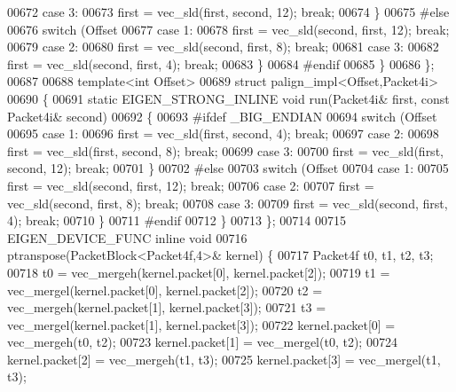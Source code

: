 \begin{DoxyCode}
{00672     \textcolor{keywordflow}{case} 3:
00673       first = vec\_sld(first, second, 12); \textcolor{keywordflow}{break};
00674     \}
00675 \textcolor{preprocessor}{#else}
00676     \textcolor{keywordflow}{switch} (Offset %
00677     \textcolor{keywordflow}{case} 1:
00678       first = vec\_sld(second, first, 12); \textcolor{keywordflow}{break};
00679     \textcolor{keywordflow}{case} 2:
00680       first = vec\_sld(second, first, 8); \textcolor{keywordflow}{break};
00681     \textcolor{keywordflow}{case} 3:
00682       first = vec\_sld(second, first, 4); \textcolor{keywordflow}{break};
00683     \}
00684 \textcolor{preprocessor}{#endif}
00685   \}
00686 \};
00687 
00688 \textcolor{keyword}{template}<\textcolor{keywordtype}{int} Offset>
00689 \textcolor{keyword}{struct }palign\_impl<Offset,Packet4i>
00690 \{
00691   \textcolor{keyword}{static} EIGEN\_STRONG\_INLINE \textcolor{keywordtype}{void} run(Packet4i& first, \textcolor{keyword}{const} Packet4i& second)
00692   \{
00693 \textcolor{preprocessor}{#ifdef \_BIG\_ENDIAN}
00694     \textcolor{keywordflow}{switch} (Offset %
00695     \textcolor{keywordflow}{case} 1:
00696       first = vec\_sld(first, second, 4); \textcolor{keywordflow}{break};
00697     \textcolor{keywordflow}{case} 2:
00698       first = vec\_sld(first, second, 8); \textcolor{keywordflow}{break};
00699     \textcolor{keywordflow}{case} 3:
00700       first = vec\_sld(first, second, 12); \textcolor{keywordflow}{break};
00701     \}
00702 \textcolor{preprocessor}{#else}
00703     \textcolor{keywordflow}{switch} (Offset %
00704     \textcolor{keywordflow}{case} 1:
00705       first = vec\_sld(second, first, 12); \textcolor{keywordflow}{break};
00706     \textcolor{keywordflow}{case} 2:
00707       first = vec\_sld(second, first, 8); \textcolor{keywordflow}{break};
00708     \textcolor{keywordflow}{case} 3:
00709       first = vec\_sld(second, first, 4); \textcolor{keywordflow}{break};
00710     \}
00711 \textcolor{preprocessor}{#endif}
00712   \}
00713 \};
00714 
00715 EIGEN\_DEVICE\_FUNC \textcolor{keyword}{inline} \textcolor{keywordtype}{void}
00716 ptranspose(PacketBlock<Packet4f,4>& kernel) \{
00717   Packet4f t0, t1, t2, t3;
00718   t0 = vec\_mergeh(kernel.packet[0], kernel.packet[2]);
00719   t1 = vec\_mergel(kernel.packet[0], kernel.packet[2]);
00720   t2 = vec\_mergeh(kernel.packet[1], kernel.packet[3]);
00721   t3 = vec\_mergel(kernel.packet[1], kernel.packet[3]);
00722   kernel.packet[0] = vec\_mergeh(t0, t2);
00723   kernel.packet[1] = vec\_mergel(t0, t2);
00724   kernel.packet[2] = vec\_mergeh(t1, t3);
00725   kernel.packet[3] = vec\_mergel(t1, t3);
}
\end{DoxyCode}
